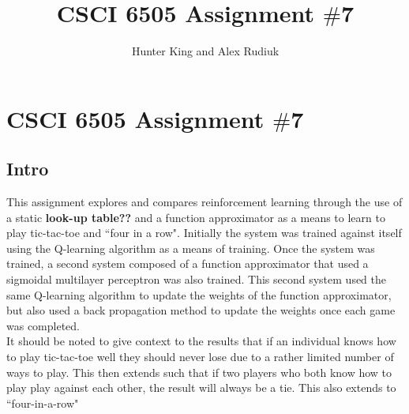 \documentclass[12pt,a4paper]{article}
\author{Hunter King and Alex Rudiuk}
\title{CSCI 6505 Assignment $\#$7}
\begin{document}
\section*{CSCI 6505 Assignment $\#$7}
\subsection*{Intro}
This assignment explores and compares reinforcement learning through the use of a static \textbf{look-up table??} and a function approximator as a means to learn to play tic-tac-toe and ``four in a row". Initially the system was trained against itself using the Q-learning algorithm as a means of training. Once the system was trained, a second system composed of a function approximator that used a sigmoidal multilayer perceptron was also trained. This second system used the same Q-learning algorithm to update the weights of the function approximator, but also used a back propagation method to update the weights once each game was completed.\\
It should be noted to give context to the results that if an individual knows how to play tic-tac-toe well they should never lose due to a rather limited number of ways to play. This then extends such that if two players who both know how to play play against each other, the result will always be a tie. This also extends to ``four-in-a-row"
\end{document}
